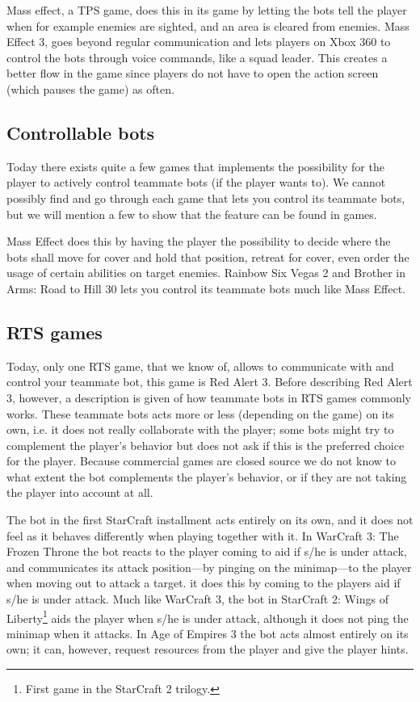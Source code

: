 Mass effect, a TPS game, does this in its game by letting the bots tell the player when for example
enemies are sighted, and an area is cleared from enemies. Mass Effect 3, goes beyond regular
communication and lets players on Xbox 360 to control the bots through voice commands, like a squad
leader. This creates a better flow in the game since players do not have to open the action screen
(which pauses the game) as often.


\subsection{Controllable bots} \label{sec:games_controllable} Today there exists quite a few games
that implements the possibility for the player to actively control teammate bots (if the player
wants to). We cannot possibly find and go through each game that lets you control its teammate bots,
but we will mention a few to show that the feature can be found in games.

Mass Effect\cite{masseffect} does this by having the player the possibility to decide where the bots
shall move for cover and hold that position, retreat for cover, even order the usage of certain
abilities on target enemies. Rainbow Six Vegas 2\cite{rainbow6} and Brother in Arms: Road to Hill
30\cite{brotherinarms} lets you control its teammate bots much like Mass Effect.


\subsection{RTS games}
Today, only one RTS game, that we know of, allows to communicate with and
control your teammate bot, this game is Red Alert 3\cite{redalert3}. Before describing Red Alert 3,
however, a description is given of how teammate bots in RTS games commonly works. These teammate
bots acts more or less (depending on the game) on its own, i.e. it does not really collaborate with
the player; some bots might try to complement the player's behavior but does not ask if this is the
preferred choice for the player. Because commercial games are closed source we do not know to what
extent the bot complements the player's behavior, or if they are not taking the player into account
at all.

The bot in the first StarCraft\cite{scbw} installment acts entirely on its own, and it does not feel
as it behaves differently when playing together with it. In WarCraft 3: The Frozen
Throne\cite{wc3ft} the bot reacts to the player coming to aid if s/he is under attack, and
communicates its attack position—by pinging on the minimap—to the player when moving out to attack a
target. it does this by coming to the players aid if s/he is under attack. Much like WarCraft 3, the
bot in StarCraft 2: Wings of Liberty\footnote{First game in the StarCraft 2 trilogy.}\cite{sc2wol}
aids the player when s/he is under attack, although it does not ping the minimap when it attacks. In
Age of Empires 3\cite{ageofempires3} the bot acts almost entirely on its own; it can, however,
request resources from the player and give the player hints.

